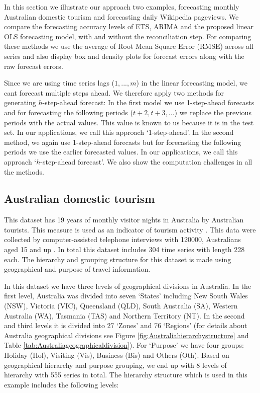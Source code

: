 \documentclass[11pt,a4paper,]{article}
\begin{document}
In this section we illustrate our approach two examples, forecasting
monthly Australian domestic tourism and forecasting daily Wikipedia
pageviews. We compare the forecasting accuracy levels of ETS, ARIMA and
the proposed linear OLS forecasting model, with and without the
reconciliation step. For comparing these methods we use the average of
Root Mean Square Error (RMSE) across all series and also display box and
density plots for forecast errors along with the raw forecast errors.

Since we are using time series lags (\(1, ..., m\)) in the linear
forecasting model, we cant forecast multiple steps ahead. We therefore
apply two methods for generating \(h\)-step-ahead forecast: In the first
model we use 1-step-ahead forecasts and for forecasting the following
periods (\(t+2,t+3,...\)) we replace the previous periods with the
actual values. This value is known to us because it is in the test set.
In our applications, we call this approach `1-step-ahead'. In the second
method, we again use 1-step-ahead forecasts but for forecasting the
following periods we use the earlier forecasted values. In our
applications, we call this approach `\(h\)-step-ahead forecast'. We also
show the computation challenges in all the methods.

\subsection{Australian domestic
tourism}\label{australian-domestic-tourism}

This dataset has 19 years of monthly visitor nights in Australia by
Australian tourists. This measure is used as an indicator of tourism
activity \autocite{wickramasuriya2018optimal}. This data were collected
by computer-assisted telephone interviews with 120000, Australians aged
15 and up \autocite[Research tourism][]{researchAustralia2005}. In total
this dataset includes 304 time series with length 228 each. The
hierarchy and grouping structure for this dataset is made using
geographical and purpose of travel information.

In this dataset we have three levels of geographical divisions in
Australia. In the first level, Australia was divided into seven `States'
including New South Wales (NSW), Victoria (VIC), Queensland (QLD), South
Australia (SA), Western Australia (WA), Tasmania (TAS) and Northern
Territory (NT). In the second and third levels it is divided into 27
`Zones' and 76 `Regions' (for details about Australia geographical
divisions see Figure \ref{fig:Australiahierarchystructure} and Table
\ref{tab:Australiageographicaldivision}). For `Purpose' we have four
groups: Holiday (Hol), Visiting (Vis), Business (Bis) and Others (Oth).
Based on geographical hierarchy and purpose grouping, we end up with 8
levels of hierarchy with 555 series in total. The hierarchy structure
which is used in this example includes the following levels:
\end{document}
